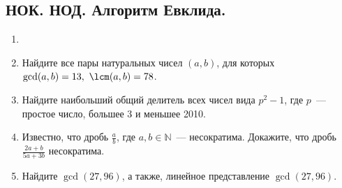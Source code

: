 \documentclass[11pt]{article}
\begin{document}
    \subsection{НОК. НОД. Алгоритм Евклида. }
    \begin{enumerate}[start=16,label={\bfseries \arabic*.}]
        \item

        \item Найдите все пары натуральных чисел $(a, b)$, для которых $\gcd(a, b) = 13, \ \lcm(a, b) = 78$.

        \item Найдите наибольший общий делитель всех чисел вида $p^2 - 1$, где $p$~--- простое число, большее 3 и меньшее 2010.

        \item Известно, что дробь $\frac{a}{b}$, где $a, b \in \mathbb{N}$~--- несократима. Докажите, что дробь $\frac{2a + b}{5a + 3b}$ несократима.

        \item Найдите $\gcd(27, 96)$, а также, линейное представление $\gcd(27, 96)$.
    \end{enumerate}
\end{document}
